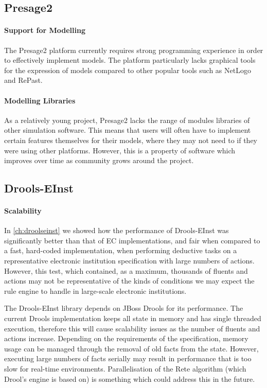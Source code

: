 \subsection{Presage2}

\paragraph{Support for Modelling} The Presage2 platform currently requires
strong programming experience in order to effectively implement models. The
platform particularly lacks graphical tools for the expression of models
compared to other popular tools such as NetLogo and RePast.

\paragraph{Modelling Libraries} As a relatively young project, Presage2 lacks
the range of modules libraries of other simulation software. This means that
users will often have to implement certain features themselves for their
models, where they may not need to if they were using other platforms.
However, this is a property of software which improves over time as community
grows around the project.

\subsection{Drools-EInst}

\paragraph{Scalability}

In \autoref{ch:droolseinst} we showed how the performance of Drools-EInst was
significantly better than that of \ac{EC} implementations, and fair when
compared to a fast, hard-coded implementation, when performing deductive tasks
on a representative electronic institution specification with large numbers of
actions. However, this test, which contained, as a maximum, thousands of
fluents and actions may not be representative of the kinds of conditions we
may expect the rule engine to handle in large-scale electronic institutions.

The Drools-EInst library depends on JBoss Drools for its performance. The
current Drools implementation keeps all state in memory and has single
threaded execution, therefore this will cause scalability issues as the number
of fluents and actions increase. Depending on the requirements of the
specification, memory usage can be managed through the removal of old facts
from the state. However, executing large numbers of facts serially may result
in performance that is too slow for real-time environments. Parallelisation of
the Rete algorithm (which Drool's engine is based on) is something which could
address this in the future.


